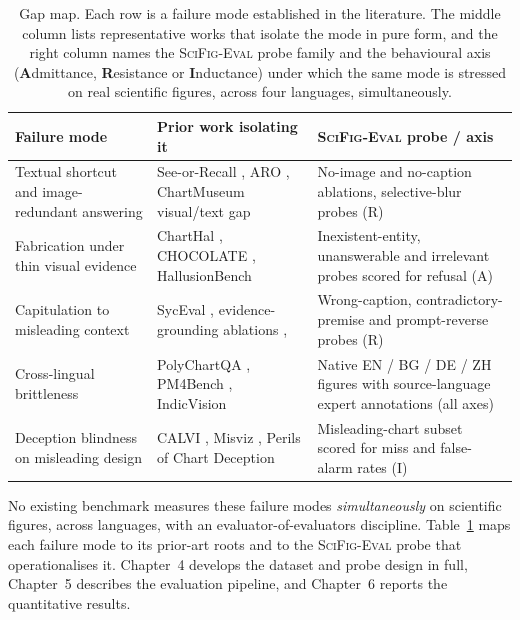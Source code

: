 \begin{table}[t]
  \centering
  \footnotesize
  \setlength{\tabcolsep}{6pt}
  \renewcommand{\arraystretch}{1.25}
  \caption[Failure-mode coverage across prior work and \textsc{SciFig-Eval} probes.]{%
    Gap map. Each row is a failure mode established in the
    literature. The middle column lists representative works that
    isolate the mode in pure form, and the right column names the
    \textsc{SciFig-Eval} probe family and the behavioural axis
    (\textbf{A}dmittance, \textbf{R}esistance or
    \textbf{I}nductance) under which the same mode is stressed
    on real scientific figures, across four languages,
    simultaneously.}
  \label{tab:lit-gapmap}
  \begin{tabular}{@{}>{\raggedright\arraybackslash}p{3.1cm} >{\raggedright\arraybackslash}p{5.1cm} >{\raggedright\arraybackslash}p{5.1cm}@{}}
    \toprule
    \textbf{Failure mode} &
    \textbf{Prior work isolating it} &
    \textbf{\textsc{SciFig-Eval} probe / axis} \\
    \midrule
    Textual shortcut and image-redundant answering &
    See-or-Recall \citep{li2025seeorrecall}, ARO
    \citep{yuksekgonul2022aro}, ChartMuseum visual/text gap
    \citep{tang2025chartmuseum} &
    No-image and no-caption ablations, selective-blur probes
    (\textsc{R}) \\
    \addlinespace[3pt]
    Fabrication under thin visual evidence &
    ChartHal \citep{xu2025charthal}, CHOCOLATE
    \citep{huang2024chocolate}, HallusionBench
    \citep{guan2024hallusionbench} &
    Inexistent-entity, unanswerable and irrelevant probes
    scored for refusal (\textsc{A}) \\
    \addlinespace[3pt]
    Capitulation to misleading context &
    SycEval \citep{fanous2025syceval}, evidence-grounding
    ablations \citep{evidencegrounding2026},
    \citet{sharma2023sycophancy} &
    Wrong-caption, contradictory-premise and prompt-reverse
    probes (\textsc{R}) \\
    \addlinespace[3pt]
    Cross-lingual brittleness &
    PolyChartQA \citep{li2025polychart}, PM4Bench
    \citep{gao2025pm4bench}, IndicVision
    \citep{sharma2025indicvision} &
    Native EN / BG / DE / ZH figures with source-language expert
    annotations (all axes) \\
    \addlinespace[3pt]
    Deception blindness on misleading design &
    CALVI \citep{pandey2025calvi}, Misviz
    \citep{tonglet2025misviz}, Perils of Chart Deception
    \citep{chartdeception2025} &
    Misleading-chart subset scored for miss and false-alarm
    rates (\textsc{I}) \\
    \bottomrule
  \end{tabular}
\end{table}

No existing benchmark measures these failure modes \emph{simultaneously} on scientific figures, across languages, with an evaluator-of-evaluators discipline.
Table~\ref{tab:lit-gapmap} maps each failure mode to its prior-art roots and to the \textsc{SciFig-Eval} probe that operationalises it.
Chapter~4 develops the dataset and probe design in full, Chapter~5 describes the evaluation pipeline, and Chapter~6 reports the quantitative results.
